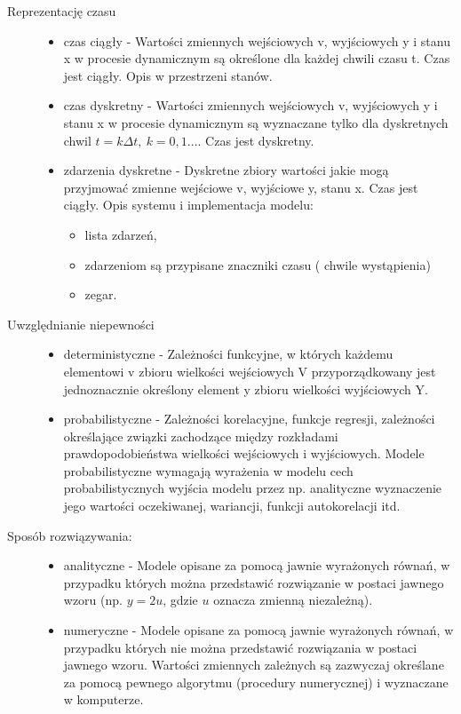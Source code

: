 \begin{description}
\begin{itemize}
    \end{itemize}
    \item[Reprezentację czasu]\mbox{}
    \begin{itemize}
        \item czas ciągły - Wartości zmiennych wejściowych v, wyjściowych y i stanu x w procesie dynamicznym są określone dla każdej chwili czasu t. Czas jest ciągły. Opis w przestrzeni stanów.
        \item czas dyskretny - Wartości zmiennych wejściowych v, wyjściowych y i stanu x w procesie dynamicznym są wyznaczane tylko dla dyskretnych chwil $t =k \Delta t,\:k=0,1...$. Czas jest dyskretny.
        \item zdarzenia dyskretne - Dyskretne zbiory wartości jakie mogą przyjmować zmienne wejściowe v, wyjściowe y, stanu x. Czas jest ciągły. Opis systemu i implementacja modelu:\mbox{}
        \begin{itemize}
            \item lista zdarzeń,
            \item zdarzeniom są przypisane znaczniki czasu ( chwile wystąpienia)
            \item zegar.
        \end{itemize}
    \end{itemize}
    \item[Uwzględnianie niepewności]\mbox{}
    \begin{itemize}
        \item deterministyczne - Zależności funkcyjne, w których każdemu elementowi v zbioru wielkości wejściowych V przyporządkowany jest jednoznacznie określony element y zbioru wielkości wyjściowych Y.
        \item probabilistyczne - Zależności korelacyjne, funkcje regresji, zależności określające związki zachodzące między rozkładami prawdopodobieństwa wielkości wejściowych i wyjściowych. Modele probabilistyczne wymagają wyrażenia w modelu cech probabilistycznych wyjścia modelu przez np. analityczne wyznaczenie jego wartości oczekiwanej, wariancji, funkcji autokorelacji itd.
    \end{itemize}
    \item[Sposób rozwiązywania:]\mbox{}
    \begin{itemize}
        \item analityczne - Modele opisane za pomocą jawnie wyrażonych równań, w przypadku których można przedstawić rozwiązanie w postaci jawnego wzoru (np. $y=2u$, gdzie $u$ oznacza zmienną niezależną).
        \item numeryczne - Modele opisane za pomocą jawnie wyrażonych równań, w przypadku których nie można przedstawić rozwiązania w postaci jawnego wzoru. Wartości zmiennych zależnych są zazwyczaj określane za pomocą pewnego algorytmu (procedury numerycznej) i wyznaczane w komputerze.

\end{itemize}
\end{description}
